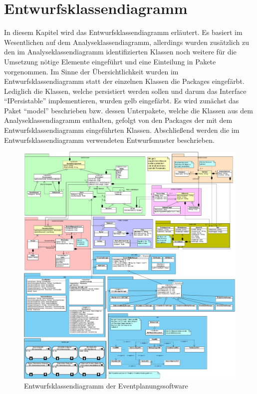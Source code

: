 \chapter{Entwurfsklassendiagramm}
In diesem Kapitel wird das Entwurfsklassendiagramm erläutert. Es basiert im Wesentlichen auf dem Analyseklassendiagramm, allerdings wurden zusätzlich zu den im Analyseklassendiagramm identifizierten Klassen noch weitere für die Umsetzung nötige Elemente eingeführt und eine Einteilung in Pakete vorgenommen. Im Sinne der Übersichtlichkeit wurden im Entwurfsklassendiagramm statt der einzelnen Klassen die Packages eingefärbt. Lediglich die Klassen, welche persistiert werden sollen und darum das Interface \enquote{IPersistable} implementieren, wurden gelb eingefärbt. Es wird zunächst das Paket \enquote{model} beschrieben bzw. dessen Unterpakete, welche die Klassen aus dem Analyseklassendiagramm enthalten, gefolgt von den Packages der mit dem Entwurfsklassendiagramm eingeführten Klassen. Abschließend werden die im Entwurfsklassendiagramm verwendeten Entwurfsmuster beschrieben.
\FloatBarrier
\begin{figure}[ht!]
    \includegraphics[width=0.98\columnwidth]{Bilder/ekd.pdf}
    \caption{Entwurfsklassendiagramm der Eventplanungssoftware}
\end{figure}

